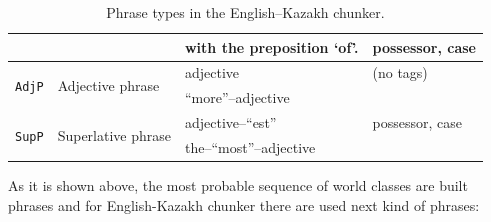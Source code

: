 \documentclass[11pt]{article}
\begin{document}
\begin{savenotes}
\begin{table}
\begin{tabular}{|l|l|l|l|}
                                   &                                   & with the preposition `of'. & possessor, case \\
    \hline
    \multirow{2}{*}{\texttt{AdjP}} & \multirow{2}{*}{Adjective phrase}  & adjective & (no tags) \\
                                   &                                    & ``more''--adjective & \\
    \hline
    \multirow{2}{*}{\texttt{SupP}} & \multirow{2}{*}{Superlative phrase} & adjective--``est'' & possessor, case \\
                                   &                                     & the--``most''--adjective & \\ 
    \hline
  \end{tabular}
  \caption{Phrase types in the English--Kazakh chunker. }
  \label{table:phrases} 
\end{table}
\end{savenotes}
As it is shown above, the most probable sequence of world classes are built phrases and 
for English-Kazakh chunker there are used next kind of phrases:


\end{document}
